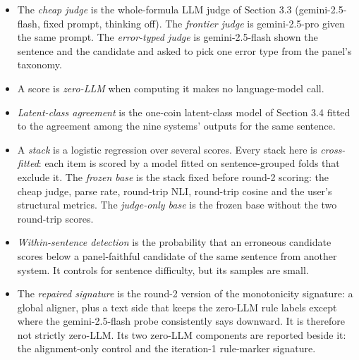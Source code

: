 \documentclass[11pt,letterpaper]{article}
\begin{document}
\begin{itemize}
\item {}The \emph{cheap judge} is the whole-formula LLM judge of Section 3.3 (gemini-2.5-flash, fixed prompt, thinking off). The \emph{frontier judge} is gemini-2.5-pro given the same prompt. The \emph{error-typed judge} is gemini-2.5-flash shown the sentence and the candidate and asked to pick one error type from the panel's taxonomy.
\item {}A score is \emph{zero-LLM} when computing it makes no language-model call.
\item {}\emph{Latent-class agreement} is the one-coin latent-class model of Section 3.4 fitted to the agreement among the nine systems' outputs for the same sentence.
\item {}A \emph{stack} is a logistic regression over several scores. Every stack here is \emph{cross-fitted}: each item is scored by a model fitted on sentence-grouped folds that exclude it. The \emph{frozen base} is the stack fixed before round-2 scoring: the cheap judge, parse rate, round-trip NLI, round-trip cosine and the user's structural metrics. The \emph{judge-only base} is the frozen base without the two round-trip scores.
\item {}\emph{Within-sentence detection} is the probability that an erroneous candidate scores below a panel-faithful candidate of the same sentence from another system. It controls for sentence difficulty, but its samples are small.
\item {}The \emph{repaired signature} is the round-2 version of the monotonicity signature: a global aligner, plus a text side that keeps the zero-LLM rule labels except where the gemini-2.5-flash probe consistently says downward. It is therefore not strictly zero-LLM. Its two zero-LLM components are reported beside it: the alignment-only control and the iteration-1 rule-marker signature.
\end{itemize}
\end{document}
